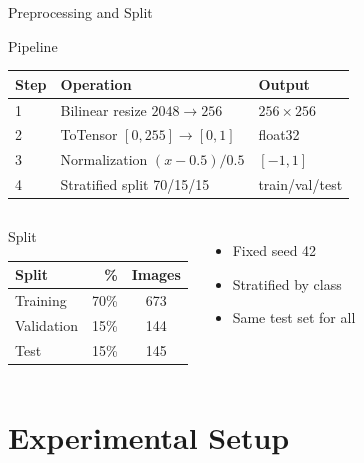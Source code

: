 \documentclass[english,10pt]{beamer}
\begin{document}
\begin{frame}{Preprocessing and Split}
  \begin{block}{Pipeline}
    \begin{tabular}{lll}\toprule
      \textbf{Step} & \textbf{Operation} & \textbf{Output}\\\midrule
      1 & Bilinear resize $2048\to256$ & $256\times256$\\
      2 & ToTensor $[0,255]\to[0,1]$ & float32\\
      3 & Normalization $(x-0.5)/0.5$ & $[-1,1]$\\
      4 & Stratified split 70/15/15 & train/val/test\\\bottomrule
    \end{tabular}
  \end{block}
  \begin{columns}
      \begin{block}{Split}
        \begin{tabular}{lrc}\toprule
          \textbf{Split} & \textbf{\%} & \textbf{Images}\\\midrule
          Training  & 70\% & 673\\
          Validation & 15\% & 144\\
          Test      & 15\% & 145\\\bottomrule
        \end{tabular}
      \end{block}
      \begin{itemize}
        \item Fixed seed 42
        \item Stratified by class
        \item Same test set for all
      \end{itemize}
  \end{columns}
\end{frame}

\section{Experimental Setup}
\end{document}
